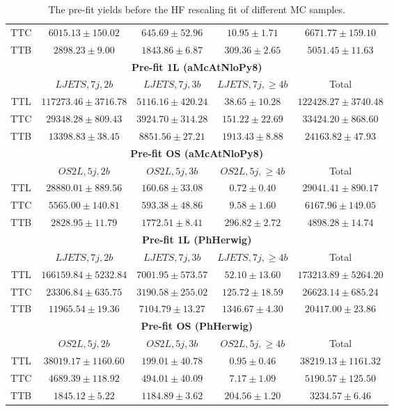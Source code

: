 \begin{table}[!htb]
{\begin{tabular}{c|c|c|c||c}
TTC & $6015.13\pm 150.02$ & $645.69 \pm 52.96$ & $10.95 \pm 1.71$ & $6671.77 \pm 159.10$  \\
TTB & $2898.23 \pm 9.00$ & $1843.86 \pm 6.87$ & $309.36 \pm 2.65$ & $5051.45 \pm 11.63$ \\
        \hline \hline \hline
        \multicolumn{5}{c}{\textbf{Pre-fit 1L (aMcAtNloPy8)}}\\
        \hline
        & $LJETS,7j,2b$ & $LJETS,7j,3b$ & $LJETS,7j,\geq 4b$ & Total \\
        \hline
TTL & $117273.46 \pm 3716.78$ & $5116.16 \pm 420.24$ & $38.65 \pm 10.28$ & $122428.27 \pm 3740.48$\\
TTC & $29348.28 \pm 809.43$ & $3924.70 \pm 314.28$ & $151.22 \pm 22.69$ & $33424.20 \pm 868.60$  \\
TTB & $13398.83 \pm 38.45$ & $8851.56 \pm 27.21$ & $1913.43 \pm 8.88$ & $24163.82 \pm 47.93$ \\
        \hline \hline
        \multicolumn{5}{c}{\textbf{Pre-fit OS (aMcAtNloPy8)}}\\
        \hline
        & $OS2L,5j,2b$ & $OS2L,5j,3b$ & $OS2L,5j,\geq 4b$ & Total \\
        \hline
TTL &  $28880.01 \pm 889.56$ & $160.68 \pm 33.08$ & $0.72 \pm 0.40$ & $29041.41 \pm 890.17$ \\
TTC & $5565.00 \pm 140.81$ & $593.38 \pm 48.86$ & $9.58 \pm 1.60$ & $6167.96 \pm 149.05$\\
TTB & $2828.95 \pm 11.79$ & $1772.51 \pm 8.41$ & $296.82 \pm 2.72$ & $4898.28 \pm 14.74$\\
        \hline \hline \hline
        \multicolumn{5}{c}{\textbf{Pre-fit 1L (PhHerwig)}}\\
        \hline 
 & $LJETS,7j,2b$ & $LJETS,7j,3b$ & $LJETS,7j,\geq 4b$ & Total \\
        \hline
TTL & $166159.84 \pm 5232.84$ & $7001.95 \pm 573.57$ & $52.10 \pm 13.60$ & $173213.89 \pm 5264.20$ \\
TTC & $23306.84 \pm 635.75$ & $3190.58 \pm 255.02$ & $125.72 \pm 18.59$ & $26623.14 \pm 685.24$ \\
TTB & $11965.54 \pm 19.36$ & $7104.79 \pm 13.27$ & $1346.67 \pm 4.30$ & $20417.00 \pm 23.86$ \\ 
        \hline \hline
        \multicolumn{5}{c}{\textbf{Pre-fit OS (PhHerwig)}}\\
        \hline
 & $OS2L,5j,2b$ & $OS2L,5j,3b$ & $OS2L,5j,\geq 4b$ & Total \\
        \hline
TTL & $38019.17 \pm 1160.60$ & $199.01 \pm 40.78$ & $0.95 \pm 0.46$ & $38219.13 \pm 1161.32$ \\
TTC & $4689.39 \pm 118.92$ & $494.01 \pm 40.09$ & $7.17 \pm 1.09$ & $5190.57 \pm 125.50$ \\
TTB & $1845.12 \pm 5.22$ & $1184.89 \pm 3.62$ & $204.56 \pm 1.20$ & $3234.57 \pm 6.46$ \\ 
       \hline \hline
    \end{tabular}
    }
    \caption{\label{tab:HF_preFit}The pre-fit yields before the HF rescaling fit of different MC samples.}\end{table}

